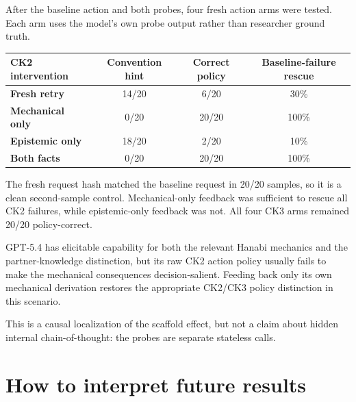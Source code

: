 \documentclass[11pt,a4paper]{article}
\begin{document}
After the baseline action and both probes, four fresh action arms were tested.
Each arm uses the model's own probe output rather than researcher ground truth.

\begin{table}[H]
\centering
\small
\begin{tabularx}{\textwidth}{>{\bfseries}p{34mm}CCC}
\toprule
CK2 intervention & Convention hint & Correct policy & Baseline-failure rescue \\
\midrule
Fresh retry & 14/20 & 6/20 & 30\% \\
Mechanical only & 0/20 & 20/20 & 100\% \\
Epistemic only & 18/20 & 2/20 & 10\% \\
Both facts & 0/20 & 20/20 & 100\% \\
\bottomrule
\end{tabularx}
\end{table}

The fresh request hash matched the baseline request in 20/20 samples, so it is a
clean second-sample control. Mechanical-only feedback was sufficient to rescue
all CK2 failures, while epistemic-only feedback was not. All four CK3 arms
remained 20/20 policy-correct.

\begin{callout}
GPT-5.4 has elicitable capability for both the relevant Hanabi mechanics and the
partner-knowledge distinction, but its raw CK2 action policy usually fails to
make the mechanical consequences decision-salient. Feeding back only its own
mechanical derivation restores the appropriate CK2/CK3 policy distinction in
this scenario.
\end{callout}

This is a causal localization of the scaffold effect, but not a claim about
hidden internal chain-of-thought: the probes are separate stateless calls.

\section{How to interpret future results}
\end{document}
